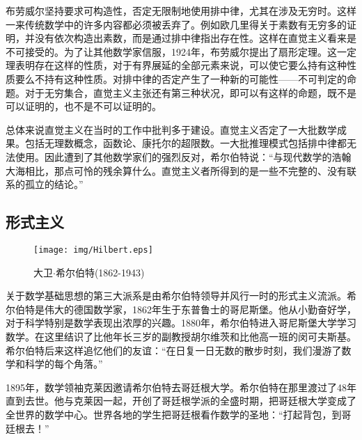 \documentclass{article}
\begin{document}
布劳威尔坚持要求可构造性，否定无限制地使用排中律，尤其在涉及无穷时。这样一来传统数学中的许多内容都必须被丢弃了。例如欧几里得关于素数有无穷多的证明，并没有依次构造出素数，而是通过排中律指出存在性。这样在直觉主义看来是不可接受的。为了让其他数学家信服，1924年，布劳威尔提出了扇形定理。这一定理表明存在这样的性质，对于有界展延的全部元素来说，可以使它要么持有这种性质要么不持有这种性质。对排中律的否定产生了一种新的可能性——不可判定的命题。对于无穷集合，直觉主义主张还有第三种状况，即可以有这样的命题，既不是可以证明的，也不是不可以证明的。

总体来说直觉主义在当时的工作中批判多于建设。直觉主义否定了一大批数学成果。包括无理数概念，函数论、康托尔的超限数。一大批推理模式包括排中律都无法使用。因此遭到了其他数学家们的强烈反对，希尔伯特说：“与现代数学的浩翰大海相比，那点可怜的残余算什么。直觉主义者所得到的是一些不完整的、没有联系的孤立的结论。”


\subsection{形式主义}

\begin{wrapfigure}{L}{0.5\textwidth}
 \centering
 \texttt{[image: img/Hilbert.eps]}
 \captionsetup{labelformat=empty}
 \caption{大卫$\cdot$希尔伯特(1862-1943)}
 \label{fig:Hilbert}
\end{wrapfigure}

关于数学基础思想的第三大派系是由希尔伯特领导并风行一时的形式主义流派。希尔伯特是伟大的德国数学家，1862年生于东普鲁士的哥尼斯堡。他从小勤奋好学，对于科学特别是数学表现出浓厚的兴趣。1880年，希尔伯特进入哥尼斯堡大学学习数学。在这里结识了比他年长三岁的副教授胡尔维茨和比他高一班的闵可夫斯基。希尔伯特后来这样追忆他们的友谊：“在日复一日无数的散步时刻，我们漫游了数学和科学的每个角落。”


1895年，数学领袖克莱因邀请希尔伯特去哥廷根大学。希尔伯特在那里渡过了48年直到去世。他与克莱因一起，开创了哥廷根学派的全盛时期，把哥廷根大学变成了全世界的数学中心。世界各地的学生把哥廷根看作数学的圣地：“打起背包，到哥廷根去！”
\end{document}
